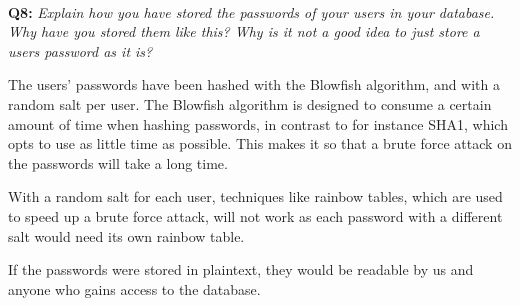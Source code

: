 \paragraph{}
\textbf{Q8:}
\textit{Explain how you have stored the passwords of your users in your database. Why have you stored them like this? Why is it not a good idea to just store a users password as it is?}

The users' passwords have been hashed with the Blowfish\cite{blowfish} algorithm, and with a random salt per user.
The Blowfish algorithm is designed to consume a certain amount of time when hashing passwords, in contrast to for instance SHA1, which opts to use as little time as possible.
This makes it so that a brute force attack on the passwords will take a long time.

With a random salt for each user, techniques like rainbow tables, which are used to speed up a brute force attack, will not work as each password with a different salt would need its own rainbow table.

If the passwords were stored in plaintext, they would be readable by us and anyone who gains access to the database.
